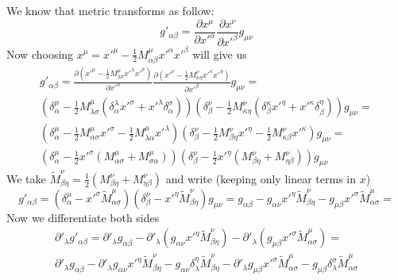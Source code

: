 We know that metric transforms as follow:
%
\begin{equation}
    g'_{\alpha\beta} = \frac{\partial x^\mu}{\partial x'^\alpha}
    \frac{\partial x^\nu}{\partial x'^\beta} g_{\mu\nu}
\end{equation}
%
Now choosing $x^\mu = x'^\mu - \frac{1}{2} M_{\alpha\beta}^\mu x'^\alpha
    x'^\beta $ will give us
%
\begin{multline}
    g'_{\alpha\beta} = \frac{\partial
        (x'^\mu - \frac{1}{2} M_{\lambda\sigma}^\mu x'^\lambda x'^\sigma)}{\partial x'^\alpha}
    \frac{\partial
        (x'^\nu - \frac{1}{2} M_{\kappa\eta}^\nu x'^\kappa x'^\eta)}{\partial x'^\beta}
    g_{\mu\nu} =\\
    \left(\delta^\mu_\alpha -
    \frac{1}{2} M_{\lambda\sigma}^\mu
    (\delta^\lambda_\alpha x'^\sigma + x'^\lambda \delta^\sigma_\alpha)\right)
    \left(\delta^\nu_\beta -
    \frac{1}{2} M_{\kappa\eta}^\nu
    (\delta^\kappa_\beta x'^\eta + x'^\kappa \delta^\eta_\beta)\right)g_{\mu\nu} = \\
    \left(\delta^\mu_\alpha -
    \frac{1}{2} M_{\alpha\sigma}^\mu x'^\sigma -
    \frac{1}{2} M_{\lambda\alpha}^\mu x'^\lambda\right)
    \left(\delta^\nu_\beta -
    \frac{1}{2} M_{\beta\eta}^\nu x'^\eta -
    \frac{1}{2} M_{\kappa\beta}^\nu x'^\kappa\right)g_{\mu\nu} = \\
    \left(\delta^\mu_\alpha -
    \frac{1}{2}x'^\sigma( M_{\alpha\sigma}^\mu + M_{\sigma\alpha}^\mu)\right)
    \left(\delta^\nu_\beta -
    \frac{1}{2} x'^\eta (M_{\beta\eta}^\nu + M_{\eta\beta}^\nu)\right)g_{\mu\nu}
\end{multline}
%
We take $\tilde{M}_{\beta\eta}^\nu = \frac{1}{2}(M_{\beta\eta}^\nu +
    M_{\eta\beta}^\nu)$ and write (keeping only linear terms in $x$)
%
\begin{equation}
    g'_{\alpha\beta} =
    \left(\delta^\mu_\alpha -
    x'^\sigma \tilde{M}_{\alpha\sigma}^\mu\right)
    \left(\delta^\nu_\beta -
    x'^\eta \tilde{M}_{\beta\eta}^\nu\right)g_{\mu\nu} =
    g_{\alpha\beta} -
    g_{\alpha\nu} x'^\eta \tilde{M}_{\beta\eta}^\nu -
    g_{\mu\beta} x'^\sigma \tilde{M}_{\alpha\sigma}^\mu =
\end{equation}
%
Now we differentiate both sides
%
\begin{multline}
    \partial'_\lambda g'_{\alpha\beta} =
    \partial'_\lambda g_{\alpha\beta} -
    \partial'_\lambda (g_{\alpha\nu} x'^\eta \tilde{M}_{\beta\eta}^\nu) -
    \partial'_\lambda (g_{\mu\beta} x'^\sigma \tilde{M}_{\alpha\sigma}^\mu) = \\
    \partial'_\lambda g_{\alpha\beta} -
    \partial'_\lambda g_{\alpha\nu} x'^\eta \tilde{M}_{\beta\eta}^\nu -
    g_{\alpha\nu} \delta^\eta_\lambda \tilde{M}_{\beta\eta}^\nu -
    \partial'_\lambda g_{\mu\beta} x'^\sigma \tilde{M}_{\alpha\sigma}^\mu -
    g_{\mu\beta} \delta^\sigma_\lambda \tilde{M}_{\alpha\sigma}^\mu
\end{multline}
